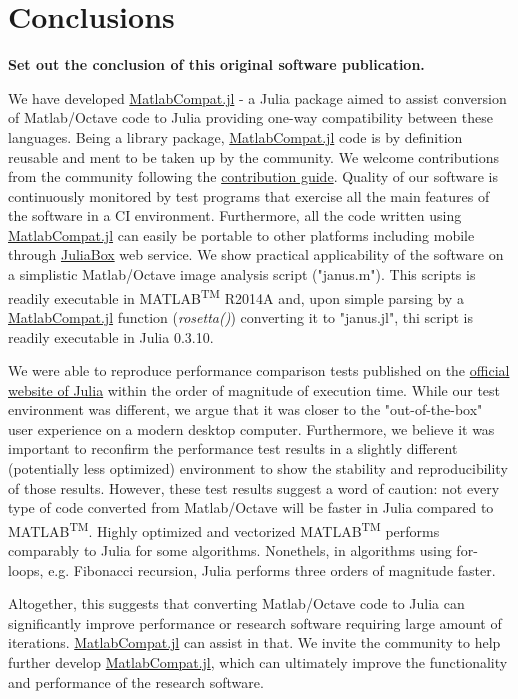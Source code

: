 \section{Conclusions}

\textbf{Set out the conclusion of this original software publication.}

We have developed \href{https://github.com/MatlabCompat/MatlabCompat.jl}{MatlabCompat.jl} - a Julia package aimed to assist conversion of Matlab/Octave code to Julia providing one-way compatibility between these languages. Being a library package, \href{https://github.com/MatlabCompat/MatlabCompat.jl}{MatlabCompat.jl} code is by definition reusable and ment to be taken up by the community. We welcome contributions from the community following the \href{http://matlabcompat.github.io/contribute.html}{contribution guide}. Quality of our software is continuously monitored by test programs that exercise all the main features of the software in a CI environment. Furthermore, all the code written using \href{https://github.com/MatlabCompat/MatlabCompat.jl}{MatlabCompat.jl} can easily be portable to other platforms including mobile through \href{https://www.juliabox.org/}{JuliaBox} web service. We show practical applicability of the software on a simplistic Matlab/Octave image analysis script ("janus.m"). This scripts is readily executable in MATLAB\textsuperscript{TM} R2014A and, upon simple parsing by a \href{https://github.com/MatlabCompat/MatlabCompat.jl}{MatlabCompat.jl} function (\textit{rosetta()}) converting it to "janus.jl", thi script is readily executable in Julia 0.3.10.

We were able to reproduce performance comparison tests published on the \href{http://julialang.org/benchmarks/}{official website of Julia} within the order of magnitude of execution time. While our test environment was different, we argue that it was closer to the "out-of-the-box" user experience on a modern desktop computer. Furthermore, we believe it was important to reconfirm the performance test results in a slightly different (potentially less optimized) environment to show the stability and reproducibility of those results. However, these test results suggest a word of caution: not every type of code converted from Matlab/Octave will be faster in Julia compared to MATLAB\textsuperscript{TM}. Highly optimized and vectorized MATLAB\textsuperscript{TM} performs comparably to Julia for some algorithms. Nonethels, in algorithms using for-loops, e.g. Fibonacci recursion, Julia performs three orders of magnitude faster.

Altogether, this suggests that converting Matlab/Octave code to Julia can significantly improve performance or research software requiring large amount of iterations. \href{https://github.com/MatlabCompat/MatlabCompat.jl}{MatlabCompat.jl} can assist in that. We invite the community to help further develop \href{https://github.com/MatlabCompat/MatlabCompat.jl}{MatlabCompat.jl}, which can ultimately improve the functionality and performance of the research software.
  
  
  
  
  